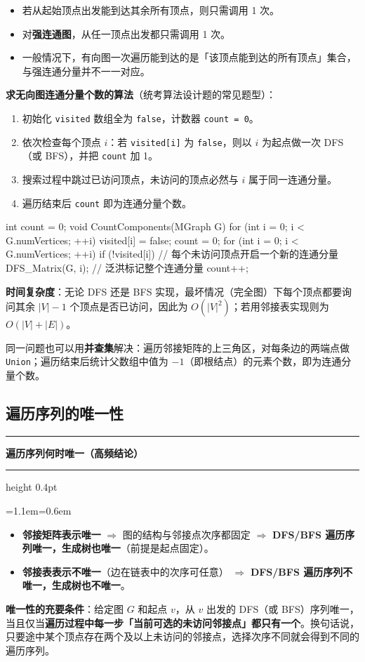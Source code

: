 \documentclass[11pt,openany,UTF8]{ctexbook}
\newcommand{\callouthead}[2]{%
  \par\addvspace{7pt}\noindent
  {\color{#1}\rule[-0.15em]{3pt}{1.05em}}\hspace{0.5em}%
  {\bfseries\color{#1}#2}\par\nobreak\vspace{-0.35em}%
  {\color{rulesep}\hrule height 0.4pt}\nobreak\vspace{0.45em}%
  \begingroup\small\setlength{\parindent}{0pt}%
  \leftskip=1.1em\rightskip=0.6em\noindent\ignorespaces}
\newcommand{\calloutend}{\par\endgroup\addvspace{7pt}}
\newenvironment{callkey}[1]{\callouthead{keybar}{#1}}{\calloutend}
\begin{document}
\begin{itemize}
\item 若从起始顶点出发能到达其余所有顶点，则只需调用 1 次。
\item 对\textbf{强连通图}，从任一顶点出发都只需调用 1 次。
\item 一般情况下，有向图一次遍历能到达的是「该顶点能到达的所有顶点」集合，与强连通分量并不一一对应。
\end{itemize}
\textbf{求无向图连通分量个数的算法}（统考算法设计题的常见题型）：

\begin{enumerate}
\item 初始化 \texttt{visited} 数组全为 \texttt{false}，计数器 \texttt{count =\allowbreak{} 0}。
\item 依次检查每个顶点 $i$：若 \texttt{visited[i]\allowbreak{}} 为 \texttt{false}，则以 $i$ 为起点做一次 DFS（或 BFS），并把 \texttt{count} 加 1。
\item 搜索过程中跳过已访问顶点，未访问的顶点必然与 $i$ 属于同一连通分量。
\item 遍历结束后 \texttt{count} 即为连通分量个数。
\end{enumerate}
\begin{codebox}
int count = 0;
void CountComponents(MGraph G) {
    for (int i = 0; i < G.numVertices; ++i) visited[i] = false;
    count = 0;
    for (int i = 0; i < G.numVertices; ++i) {
        if (!visited[i]) {          // 每个未访问顶点开启一个新的连通分量
            DFS_Matrix(G, i);       // 泛洪标记整个连通分量
            count++;
        }
    }
}
\end{codebox}

\textbf{时间复杂度}：无论 DFS 还是 BFS 实现，最坏情况（完全图）下每个顶点都要询问其余 $|V|-1$ 个顶点是否已访问，因此为 $O(|V|^{2})$；若用邻接表实现则为 $O(|V|+|E|)$。

同一问题也可以用\textbf{并查集}解决：遍历邻接矩阵的上三角区，对每条边的两端点做 \texttt{Union}；遍历结束后统计父数组中值为 $-1$（即根结点）的元素个数，即为连通分量个数。

\subsection{遍历序列的唯一性}

\begin{callkey}{遍历序列何时唯一（高频结论）}
\begin{itemize}
\item \textbf{邻接矩阵表示唯一} $\Rightarrow$ 图的结构与邻接点次序都固定 $\Rightarrow$ \textbf{DFS/BFS 遍历序列唯一，生成树也唯一}（前提是起点固定）。
\item \textbf{邻接表表示不唯一}（边在链表中的次序可任意） $\Rightarrow$ \textbf{DFS/BFS 遍历序列不唯一，生成树也不唯一}。
\end{itemize}
\textbf{唯一性的充要条件}：给定图 $G$ 和起点 $v$，从 $v$ 出发的 DFS（或 BFS）序列唯一，当且仅当\textbf{遍历过程中每一步「当前可选的未访问邻接点」都只有一个}。换句话说，只要途中某个顶点存在两个及以上未访问的邻接点，选择次序不同就会得到不同的遍历序列。

\end{callkey}
\end{document}

